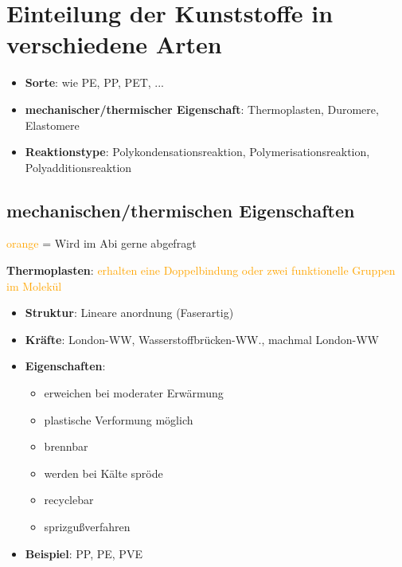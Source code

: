 \section{Einteilung der Kunststoffe in verschiedene Arten}

\begin{itemize}
    \item \textbf{Sorte}: wie PE, PP, PET, ...
    \item \textbf{mechanischer/thermischer Eigenschaft}: Thermoplasten, Duromere, Elastomere
    \item \textbf{Reaktionstype}: Polykondensationsreaktion, Polymerisationsreaktion, Polyadditionsreaktion
\end{itemize}

\subsection{mechanischen/thermischen Eigenschaften}

\textcolor{orange}{orange} = Wird im Abi gerne abgefragt

\vspace{0.5cm}

\textbf{Thermoplasten}: \textcolor{orange}{erhalten eine Doppelbindung oder zwei funktionelle Gruppen im Molekül}
\begin{itemize}
    \item \textbf{Struktur}: Lineare anordnung (Faserartig)
    \item \textbf{Kräfte}: London-WW, Wasserstoffbrücken-WW., machmal London-WW
    \item \textbf{Eigenschaften}:
        \begin{itemize}
            \item erweichen bei moderater Erwärmung
            \item plastische Verformung möglich
            \item brennbar
            \item werden bei Kälte spröde
            \item recyclebar
            \item sprizgußverfahren
        \end{itemize}
    \item \textbf{Beispiel}: PP, PE, PVE
\end{itemize}

